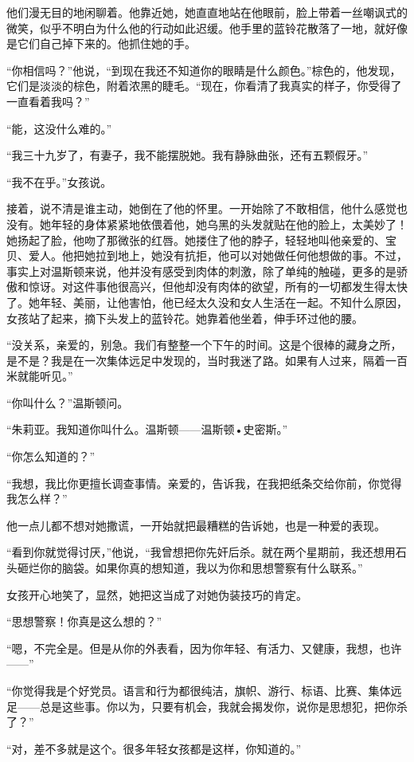 他们漫无目的地闲聊着。他靠近她，她直直地站在他眼前，脸上带着一丝嘲讽式的微笑，似乎不明白为什么他的行动如此迟缓。他手里的蓝铃花散落了一地，就好像是它们自己掉下来的。他抓住她的手。

``你相信吗？''他说，``到现在我还不知道你的眼睛是什么颜色。''棕色的，他发现，它们是淡淡的棕色，附着浓黑的睫毛。``现在，你看清了我真实的样子，你受得了一直看着我吗？''

``能，这没什么难的。''

``我三十九岁了，有妻子，我不能摆脱她。我有静脉曲张，还有五颗假牙。''

``我不在乎。''女孩说。

接着，说不清是谁主动，她倒在了他的怀里。一开始除了不敢相信，他什么感觉也没有。她年轻的身体紧紧地依偎着他，她乌黑的头发就贴在他的脸上，太美妙了！她扬起了脸，他吻了那微张的红唇。她搂住了他的脖子，轻轻地叫他亲爱的、宝贝、爱人。他把她拉到地上，她没有抗拒，他可以对她做任何他想做的事。不过，事实上对温斯顿来说，他并没有感受到肉体的刺激，除了单纯的触碰，更多的是骄傲和惊讶。对这件事他很高兴，但他却没有肉体的欲望，所有的一切都发生得太快了。她年轻、美丽，让他害怕，他已经太久没和女人生活在一起。不知什么原因，女孩站了起来，摘下头发上的蓝铃花。她靠着他坐着，伸手环过他的腰。

``没关系，亲爱的，别急。我们有整整一个下午的时间。这是个很棒的藏身之所，是不是？我是在一次集体远足中发现的，当时我迷了路。如果有人过来，隔着一百米就能听见。''

``你叫什么？''温斯顿问。

``朱莉亚。我知道你叫什么。温斯顿------温斯顿•史密斯。''

``你怎么知道的？''

``我想，我比你更擅长调查事情。亲爱的，告诉我，在我把纸条交给你前，你觉得我怎么样？''

他一点儿都不想对她撒谎，一开始就把最糟糕的告诉她，也是一种爱的表现。

``看到你就觉得讨厌，''他说，``我曾想把你先奸后杀。就在两个星期前，我还想用石头砸烂你的脑袋。如果你真的想知道，我以为你和思想警察有什么联系。''

女孩开心地笑了，显然，她把这当成了对她伪装技巧的肯定。

``思想警察！你真是这么想的？''

``嗯，不完全是。但是从你的外表看，因为你年轻、有活力、又健康，我想，也许------''

``你觉得我是个好党员。语言和行为都很纯洁，旗帜、游行、标语、比赛、集体远足------总是这些事。你以为，只要有机会，我就会揭发你，说你是思想犯，把你杀了？''

``对，差不多就是这个。很多年轻女孩都是这样，你知道的。''

